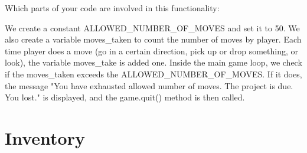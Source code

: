 \documentclass[11pt]{article}
\begin{document}
Which parts of your code are involved in this functionality:

We create a constant ALLOWED\_NUMBER\_OF\_MOVES and set it to 50. We also create a variable moves\_taken to count the number of moves by player. Each time player does a move (go in a certain direction, pick up or drop something, or look), the variable moves\_take is added one. Inside the main game loop, we check if the moves\_taken exceeds the ALLOWED\_NUMBER\_OF\_MOVES. If it does, the message "You have exhausted allowed number of moves. The project is due. You lost." is displayed, and the game.quit() method is then called.


\section*{Inventory}
\end{document}
